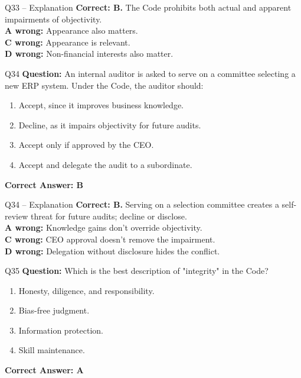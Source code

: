 \documentclass[aspectratio=169,10pt]{beamer}
\begin{document}
	\begin{frame}[t]{Q33 -- Explanation}
		\small
		\textbf{Correct: B.} The Code prohibits both actual and apparent impairments of objectivity. \\[4pt]
		\textbf{A wrong:} Appearance also matters. \\[2pt]
		\textbf{C wrong:} Appearance is relevant. \\[2pt]
		\textbf{D wrong:} Non-financial interests also matter.
	\end{frame}
	
	\begin{frame}[t]{Q34}
		\small
		\textbf{Question:} An internal auditor is asked to serve on a committee selecting a new ERP system. Under the Code, the auditor should:
		\begin{enumerate}[label=\Alph*.,itemsep=1pt,topsep=2pt]
			\item Accept, since it improves business knowledge.
			\item Decline, as it impairs objectivity for future audits.
			\item Accept only if approved by the CEO.
			\item Accept and delegate the audit to a subordinate.
		\end{enumerate}
		\vspace{4pt}
		\textbf{Correct Answer: B}
	\end{frame}
	
	\begin{frame}[t]{Q34 -- Explanation}
		\small
		\textbf{Correct: B.} Serving on a selection committee creates a self-review threat for future audits; decline or disclose. \\[4pt]
		\textbf{A wrong:} Knowledge gains don't override objectivity. \\[2pt]
		\textbf{C wrong:} CEO approval doesn't remove the impairment. \\[2pt]
		\textbf{D wrong:} Delegation without disclosure hides the conflict.
	\end{frame}
	
	\begin{frame}[t]{Q35}
		\small
		\textbf{Question:} Which is the best description of "integrity" in the Code?
		\begin{enumerate}[label=\Alph*.,itemsep=1pt,topsep=2pt]
			\item Honesty, diligence, and responsibility.
			\item Bias-free judgment.
			\item Information protection.
			\item Skill maintenance.
		\end{enumerate}
		\vspace{4pt}
		\textbf{Correct Answer: A}
	\end{frame}
	
\end{document}
